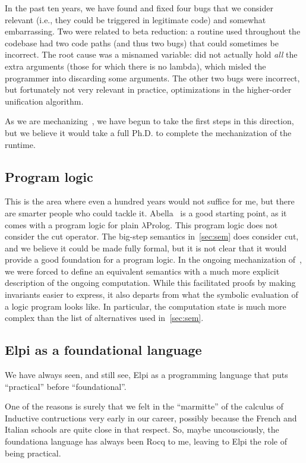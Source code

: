 \documentclass[a4paper, 11pt]{book}
\begin{document}
In the past ten years, we have found and fixed four bugs that we consider
relevant (i.e., they could be triggered in legitimate code) and somewhat
embarrassing. Two were related to beta reduction: a routine used throughout the
codebase had two code paths (and thus two bugs) that could sometimes be
incorrect. The root cause was a misnamed variable:  did not
actually hold \emph{all} the extra arguments (those for which there is no
lambda), which misled the programmer into discarding some arguments. The other
two bugs were incorrect, but fortunately not very relevant in practice,
optimizations in the higher-order unification algorithm.

As we are mechanizing~\cite{elpidet}, we have begun to take the first steps in
this direction, but we believe it would take a full Ph.D. to complete the
mechanization of the runtime.

\subsection{Program logic}

This is the area where even a hundred years would not suffice for me, but there
are smarter people who could tackle it. Abella~\cite{abella} is a good starting
point, as it comes with a program logic for plain $\lambda$Prolog. This program
logic does not consider the cut operator. The big-step semantics
in~\cref{sec:sem} does consider cut, and we believe it could be made fully
formal, but it is not clear that it would provide a good foundation for a
program logic. In the ongoing mechanization of~\cite{elpidet}, we were forced
to define an equivalent semantics with a much more explicit description of the
ongoing computation. While this facilitated proofs by making invariants easier
to express, it also departs from what the symbolic evaluation of a logic
program looks like. In particular, the computation state is much more complex
than the list of alternatives used in~\cref{sec:sem}.

\subsection{Elpi as a foundational language}

We have always seen, and still see, Elpi as a programming language
that puts ``practical'' before ``foundational''.

One of the reasons is surely
that we felt in the ``marmitte'' of the calculus of
Inductive contructions very early in our career, possibly because
the French and Italian schools are quite close in that respect.
So, maybe uncousciously, the foundationa language has always
been Rocq to me, leaving to Elpi the role of being practical.
\end{document}
